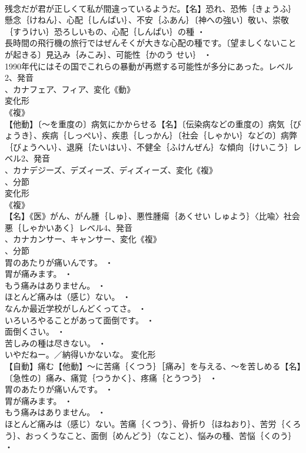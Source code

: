 \documentclass[8pt]{extreport}
\begin{document}
\begin{CJK}{UTF8}{min}
\\	残念だが君が正しくて私が間違っているようだ。【名】恐れ、恐怖｛きょうふ｝懸念｛けねん｝、心配｛しんぱい｝、不安｛ふあん｝〔神への強い〕敬い、崇敬｛すうけい｝恐ろしいもの、心配｛しんぱい｝の種 ・
\\	長時間の飛行機の旅行ではぜんそくが大きな心配の種です。〔望ましくないことが起きる〕見込み｛みこみ｝、可能性｛かのう せい｝ ・
\\	1990年代にはその国でこれらの暴動が再燃する可能性が多分にあった。レベル2、発音
\\	、カナフェア、フィア、変化《動》
\\	変化形 
\\	《複》
\\	【他動】〔～を重度の〕病気にかからせる【名】〔伝染病などの重度の〕病気｛びょうき｝、疾病｛しっぺい｝、疾患｛しっかん｝〔社会｛しゃかい｝などの〕病弊｛びょうへい｝、退廃｛たいはい｝、不健全｛ふけんぜん｝な傾向｛けいこう｝レベル2、発音
\\	、カナデジーズ、デズィーズ、ディズィーズ、変化《複》
\\	、分節
\\	変化形 
\\	《複》
\\	【名】《医》がん、がん腫｛しゅ｝、悪性腫瘍｛あくせい しゅよう｝〈比喩〉社会悪｛しゃかいあく｝レベル4、発音
\\	、カナカンサー、キャンサー、変化《複》
\\	、分節
\\	胃のあたりが痛いんです。 ・
\\	胃が痛みます。 ・
\\	もう痛みはありません。 ・
\\	ほとんど痛みは（感じ）ない。 ・
\\	なんか最近学校がしんどくってさ。 ・
\\	いろいろやることがあって面倒です。 ・
\\	面倒くさい。 ・
\\	苦しみの種は尽きない。 ・
\\	いやだねー。／納得いかないな。	変化形 
\\	【自動】痛む【他動】～に苦痛｛くつう｝［痛み］を与える、～を苦しめる【名】〔急性の〕痛み、痛覚｛つうかく｝、疼痛｛とうつう｝ ・
\\	胃のあたりが痛いんです。 ・
\\	胃が痛みます。 ・
\\	もう痛みはありません。 ・
\\	ほとんど痛みは（感じ）ない。苦痛｛くつう｝、骨折り｛ほねおり｝、苦労｛くろう｝、おっくうなこと、面倒｛めんどう｝（なこと）、悩みの種、苦悩｛くのう｝ ・

\end{CJK}
\end{document}

